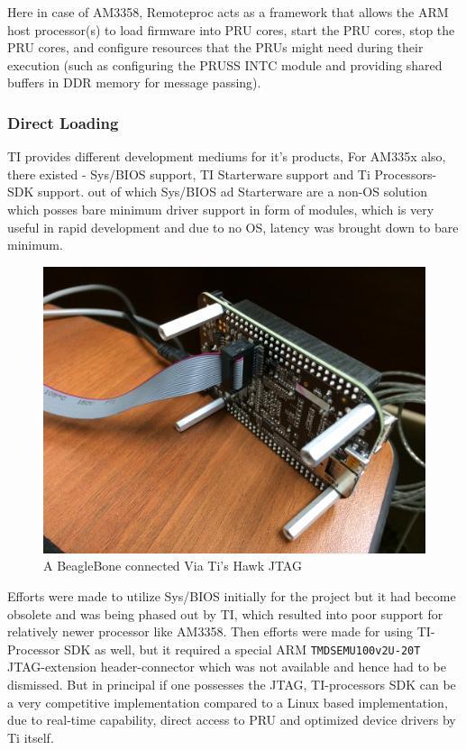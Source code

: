  Here in case of AM3358, Remoteproc acts as a framework that allows the ARM host processor(s) to load firmware into PRU cores, start the PRU cores, stop the PRU cores, and configure resources that the PRUs might need during their execution (such as configuring the PRUSS INTC module and providing shared buffers in DDR memory for message passing).

\subsubsection{Direct Loading}
TI provides different development mediums for it's products, For  AM335x also, there existed - Sys/BIOS support, TI Starterware support and Ti Processors-SDK support. out of which Sys/BIOS ad Starterware are a non-OS solution which posses bare minimum driver support in form of modules, which is very useful in rapid development and due to no OS, latency was brought down to bare minimum.
\begin{figure}[h]
	\centering
	\includegraphics[width=\textwidth/2]{fig/bbb_jtag.jpg}
	\caption{A BeagleBone connected Via Ti's Hawk JTAG}
\end{figure}

Efforts were made to utilize Sys/BIOS initially for the project but it had become obsolete and was being phased out by TI, which resulted into poor support for relatively newer processor like AM3358. Then efforts were made for using TI-Processor SDK as well, but it required a special ARM \texttt{TMDSEMU100v2U-20T} JTAG-extension header-connector which was not available and hence had to be dismissed. But in principal if one possesses the JTAG, TI-processors SDK can be a very competitive implementation compared to a Linux based implementation, due to real-time capability, direct access to PRU and optimized device drivers by Ti itself.


